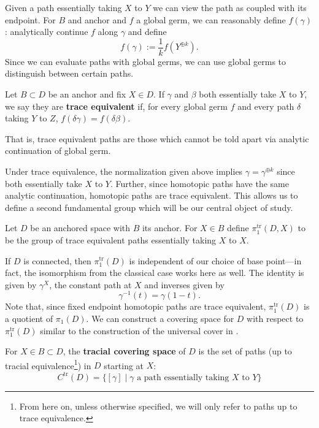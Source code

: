 Given a path essentially taking \(X\) to \(Y\) we can view the path as coupled
with its endpoint. For \(B\) and anchor and \(f\) a global germ, we can
reasonably define \(f(\gamma)\): analytically continue \(f\) along \(\gamma\) and define
\[
  f(\gamma) := \frac{1}{k} f(Y^{\oplus k}).
\]
Since we can evaluate paths with global germs, we can use global germs to
distinguish between certain paths.

\begin{definition}
\label{def:label}
  Let \(B \subset D\) be an anchor and fix \(X \in D\). If \(\gamma\) and
  \(\beta\) both essentially take \(X\) to \(Y\), we say they are
  \textbf{trace equivalent} if, for every global germ \(f\) and every path
  \(\delta\) taking \(Y\) to \(Z\), \(f(\delta\gamma)=f(\delta\beta)\).

  That is, trace equivalent paths are those which cannot be told apart via
  analytic continuation of global germ.
\end{definition}

Under trace equivalence, the normalization given above implies
\(\gamma = \gamma^{\oplus k}\) since both essentially take \(X\) to \(Y\).
Further, since homotopic paths have the same analytic continuation, homotopic
paths are trace equivalent. This allows us to define a second fundamental group
which will be our central object of study.
\begin{definition}%
\label{def:trpi1}
 Let \(D\) be an anchored space with \(B\) its anchor. For \(X \in B\) define
 \(\pi_1^{\textrm{tr}}(D,X)\) to be the group of trace equivalent paths
 essentially taking \(X\) to \(X\).
\end{definition}
If \(D\) is connected, then \(\pi_1^{\textrm{tr}}(D)\) is independent of our
choice of base point---in fact, the isomorphism from the classical case
works here as well. The identity is given by \(\gamma^X\), the
constant path at \(X\) and inverses given by
\[
  \gamma ^{-1}(t) = \gamma (1-t).
\]
Note that, since fixed endpoint homotopic paths are trace equivalent,
\(\pi_1^{\textrm{tr}}(D)\) is a quotient of \(\pi_1(D)\). We can construct a covering
space for \(D\) with respect to \(\pi_1^{\textrm{tr}}(D)\) similar to the
construction of the universal cover in \cite{hatcherAlgebraic2002}.

\begin{definition}%
\label{def:trcover}
  For \(X \in B \subset D\), the \textbf{tracial covering space} of \(D\) is the
  set of paths {(up to tracial equivalence\footnote{From here on, unless otherwise specified, we will only refer to
    paths up to trace equivalence.})}
  in \(D\) starting at \(X\):
  \[
    C^{\textrm{tr}}(D) = \{[\gamma] \mid \gamma \text{ a path essentially taking
    \(X\) to \(Y\)}\}
  \]
\end{definition}

